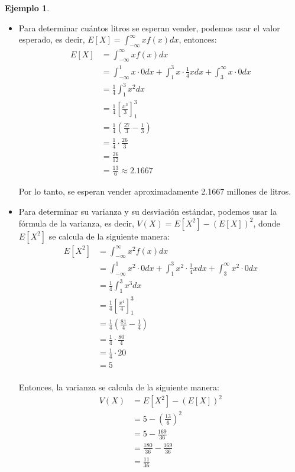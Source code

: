 \documentclass{article}
\theoremstyle{definition}
\newtheorem{example}[definition]{Ejemplo}
\theoremstyle{plain}
\theoremstyle{remark}
\begin{document}
\begin{example}
\begin{itemize}
\item Para determinar cuántos litros se esperan vender, podemos usar el valor esperado, es decir, $E[X] = \int_{-\infty}^{\infty} x f(x) dx$, entonces:
\begin{align*}
E[X] &= \int_{-\infty}^{\infty} x f(x) dx \\
&= \int_{-\infty}^{1} x \cdot 0 dx + \int_{1}^{3} x \cdot \frac{1}{4} x dx + \int_{3}^{\infty} x \cdot 0 dx \\
&= \frac{1}{4} \int_{1}^{3} x^2 dx \\
&= \frac{1}{4} \left[ \frac{x^3}{3} \right]_{1}^{3} \\
&= \frac{1}{4} \left( \frac{27}{3} - \frac{1}{3} \right) \\
&= \frac{1}{4} \cdot \frac{26}{3} \\
&= \frac{26}{12} \\
&= \frac{13}{6} \approx 2.1667
\end{align*}

Por lo tanto, se esperan vender aproximadamente 2.1667 millones de litros.

\item Para determinar su varianza y su desviación estándar, podemos usar la fórmula de la varianza, es decir, $V(X) = E[X^2] - (E[X])^2$, donde $E[X^2]$ se calcula de la siguiente manera:
\begin{align*}
E[X^2] &= \int_{-\infty}^{\infty} x^2 f(x) dx \\
&= \int_{-\infty}^{1} x^2 \cdot 0 dx + \int_{1}^{3} x^2 \cdot \frac{1}{4} x dx + \int_{3}^{\infty} x^2 \cdot 0 dx \\
&= \frac{1}{4} \int_{1}^{3} x^3 dx \\
&= \frac{1}{4} \left[ \frac{x^4}{4} \right]_{1}^{3} \\
&= \frac{1}{4} \left( \frac{81}{4} - \frac{1}{4} \right) \\
&= \frac{1}{4} \cdot \frac{80}{4} \\
&= \frac{1}{4} \cdot 20 \\
&= 5 \\
\end{align*}

Entonces, la varianza se calcula de la siguiente manera:
\begin{align*}
V(X) &= E[X^2] - (E[X])^2 \\
&= 5 - \left( \frac{13}{6} \right)^2 \\
&= 5 - \frac{169}{36} \\
&= \frac{180}{36} - \frac{169}{36} \\
&= \frac{11}{36}
\end{align*}


\end{itemize}
\end{example}
\end{document}

